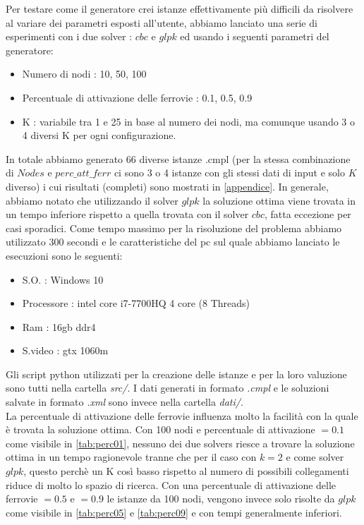 \documentclass{article}
\begin{document}
Per testare come il generatore crei istanze effettivamente più difficili da risolvere al variare dei parametri esposti all'utente, abbiamo lanciato una serie di esperimenti con i due solver : $cbc$ e $glpk$ ed usando i seguenti parametri del generatore:
\begin{itemize}
    \item Numero di nodi : 10, 50, 100
    \item Percentuale di attivazione delle ferrovie : 0.1, 0.5, 0.9
    \item K : variabile tra 1 e 25 in base al numero dei nodi, ma comunque usando 3 o 4 diversi K per ogni configurazione.
\end{itemize}
In totale abbiamo generato 66 diverse istanze .cmpl (per la stessa combinazione di $Nodes$ e $perc\_att\_ferr$ ci sono 3 o 4 istanze con gli stessi dati di input e solo $K$ diverso) i cui risultati (completi) sono mostrati in \cref{appendice}. In generale, abbiamo notato che utilizzando il solver $glpk$ la soluzione ottima viene trovata in un tempo inferiore rispetto a quella trovata con il solver $cbc$, fatta eccezione per casi sporadici. Come tempo massimo per la risoluzione del problema abbiamo utilizzato 300 secondi e le caratteristiche del pc sul quale abbiamo lanciato le esecuzioni sono le seguenti:
\begin{itemize}
    \item S.O. : Windows 10
    \item Processore : intel core i7-7700HQ 4 core (8 Threads)
    \item Ram : 16gb ddr4
    \item S.video : gtx 1060m
\end{itemize}
Gli script python utilizzati per la creazione delle istanze e per la loro valuzione sono tutti nella cartella \emph{src/}. I dati generati in formato \emph{.cmpl} e le soluzioni salvate in formato \emph{.xml} sono invece nella cartella \emph{dati/}.
\\
La percentuale di attivazione delle ferrovie influenza molto la facilità con la quale è trovata la soluzione ottima. Con 100 nodi e percentuale di attivazione $= 0.1$ come visibile in \cref{tab:perc01}, nessuno dei due solvers riesce a trovare la soluzione ottima in un tempo ragionevole tranne che per il caso con $k = 2$ e come solver $glpk$, questo perchè un K così basso rispetto al numero di possibili collegamenti riduce di molto lo spazio di ricerca. Con una percentuale di attivazione delle ferrovie $= 0.5$ e $=0.9$ le istanze da 100 nodi, vengono invece solo risolte da $glpk$ come visibile in \cref{tab:perc05} e \cref{tab:perc09} e con tempi generalmente inferiori.
\end{document}
